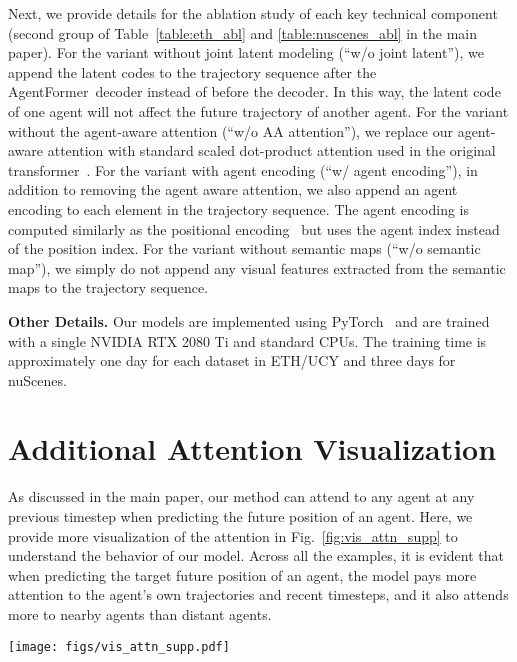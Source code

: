\documentclass[10pt,twocolumn,letterpaper]{article}
\newcommand{\mname}{AgentFormer}
\begin{document}
Next, we provide details for the ablation study of each key technical component (second group of Table~\ref{table:eth_abl} and \ref{table:nuscenes_abl} in the main paper). For the variant without joint latent modeling (``w/o joint latent''), we append the latent codes to the trajectory sequence after the \mname\ decoder instead of before the decoder. In this way, the latent code of one agent will not affect the future trajectory of another agent. For the variant without the agent-aware attention (``w/o AA attention''), we replace our agent-aware attention with standard scaled dot-product attention used in the original transformer~\cite{vaswani2017attention}. For the variant with agent encoding (``w/ agent encoding''), in addition to removing the agent aware attention, we also append an agent encoding to each element in the trajectory sequence. The agent encoding is computed similarly as the positional encoding~\cite{vaswani2017attention} but uses the agent index instead of the position index. For the variant without semantic maps (``w/o semantic map''), we simply do not append any visual features extracted from the semantic maps to the trajectory sequence.


\vspace{2mm}
\noindent\textbf{Other Details.}
Our models are implemented using PyTorch~\cite{paszke2019pytorch} and are trained with a single NVIDIA RTX 2080 Ti and standard CPUs. The training time is approximately one day for each dataset in ETH/UCY and three days for nuScenes.


\section{Additional Attention Visualization}
\label{sec:supp_vis_attn}
As discussed in the main paper, our method can attend to any agent at any previous timestep when predicting the future position of an agent. Here, we provide more visualization of the attention in Fig.~\ref{fig:vis_attn_supp} to understand the behavior of our model. Across all the examples, it is evident that when predicting the target future position of an agent, the model pays more attention to the agent's own trajectories and recent timesteps, and it also attends more to nearby agents than distant agents.

\begin{figure*}[h]
\vspace{-3mm}
    \centering
    \texttt{[image: figs/vis\_attn\_supp.pdf]}
    \caption{\textbf{Attention Visualization on ETH/UCY.} We plot the attention to past (blue) and future (green) trajectory features of all agents when inferring a target position (red). Darker color means higher attention. When predicting the target future position of an agent, the model pays more attention to the agent's own trajectories and recent timesteps, and it also attends more to nearby agents than distant agents.}
    \label{fig:vis_attn_supp}
    \vspace{-3mm}
\end{figure*}
\end{document}
